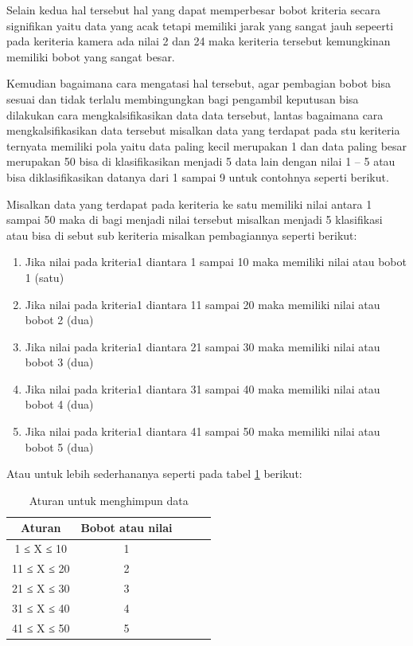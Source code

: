 Selain kedua hal tersebut hal yang dapat memperbesar bobot kriteria secara signifikan yaitu data yang acak tetapi memiliki jarak yang sangat jauh sepeerti pada keriteria kamera ada nilai 2 dan 24 maka keriteria tersebut kemungkinan memiliki bobot yang sangat besar.\par

Kemudian bagaimana cara mengatasi hal tersebut, agar pembagian bobot bisa sesuai dan tidak terlalu membingungkan bagi pengambil keputusan bisa dilakukan cara mengkalsifikasikan data data tersebut, lantas bagaimana cara mengkalsifikasikan data tersebut misalkan data yang terdapat pada stu keriteria ternyata memiliki pola yaitu data paling kecil merupakan 1 dan data paling besar merupakan 50 bisa di klasifikasikan menjadi 5 data lain dengan nilai 1 – 5 atau bisa diklasifikasikan datanya dari 1 sampai 9 untuk contohnya seperti berikut.\par

Misalkan data yang terdapat pada keriteria ke satu memiliki nilai antara 1 sampai 50 maka di bagi menjadi nilai tersebut misalkan menjadi 5 klasifikasi atau bisa di sebut sub keriteria misalkan pembagiannya seperti berikut:

\begin{enumerate}
\item Jika nilai pada kriteria1 diantara 1 sampai 10 maka memiliki nilai atau bobot 1 (satu)

\item Jika nilai pada kriteria1 diantara 11 sampai 20 maka memiliki nilai atau bobot 2 (dua)

\item Jika nilai pada kriteria1 diantara 21 sampai 30 maka memiliki nilai atau bobot 3 (dua)

\item Jika nilai pada kriteria1 diantara 31 sampai 40 maka memiliki nilai atau bobot 4 (dua)

\item Jika nilai pada kriteria1 diantara 41 sampai 50 maka memiliki nilai atau bobot 5 (dua)

\end{enumerate}

Atau untuk lebih sederhananya seperti pada tabel \ref{TB} berikut:

\begin{table}[h]
\caption{Aturan untuk menghimpun data}
\centering
\begin{tabular}{|c|c|c|c|c|}
\hline
Aturan & Bobot atau nilai \\
\hline
1 ≤ X ≤ 10 &1\\
\hline
11 ≤ X ≤ 20 &2\\
\hline
21 ≤ X ≤ 30 &3\\
\hline
31 ≤ X ≤ 40 &4\\
\hline
41 ≤ X ≤ 50 &5\\
\hline

\end{tabular}
\label{TB}
\end{table}

